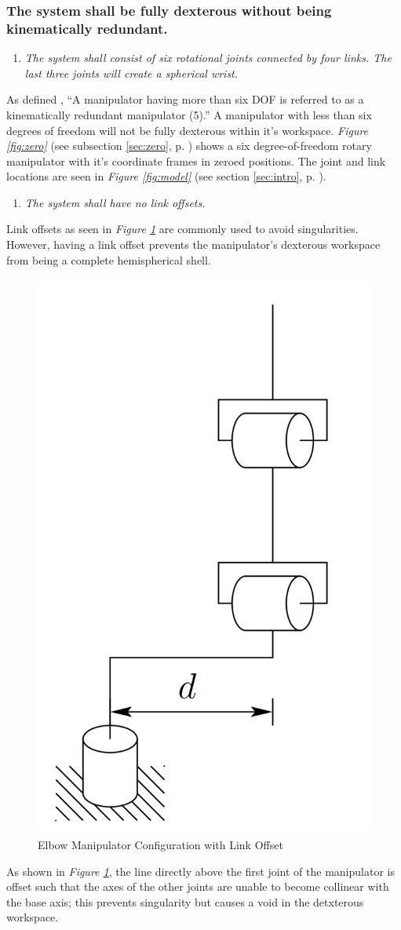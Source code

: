 \documentclass[12pt]{report}
\begin{document}
\subsubsection{The system shall be fully dexterous without being kinematically redundant.}
\begin{enumerate}
\item \textit{The system shall consist of six rotational joints connected by four links. The last three joints will create a spherical wrist.}
\end{enumerate}
As defined \cite{robo}, “A manipulator having more than six DOF is referred to as a kinematically redundant manipulator (5).” A manipulator with less than six degrees of freedom will not be fully dexterous within it's workspace. \emph{Figure \ref{fig:zero}} (see subsection \ref{sec:zero}, p. \pageref{fig:zero}) shows a six degree-of-freedom rotary manipulator with it's coordinate frames in zeroed positions. The joint and link locations are seen in \emph{Figure \ref{fig:model}} (see section \ref{sec:intro}, p. \pageref{sec:intro}).
\begin{enumerate}[resume]
\item \textit{The system shall have no link offsets.}
\end{enumerate}
Link offsets as seen in \emph{Figure \ref{fig:offset}} are commonly used to avoid singularities. However, having a link offset prevents the manipulator's dexterous workspace from being a complete hemispherical shell.

\begin{figure}[htp]
  \centering
  \includegraphics[width=.25\textwidth]{offset}
  \caption[Elbow Manipulator Configuration with Link Offset]{Elbow Manipulator Configuration with Link Offset \cite{robo}}
  \label{fig:offset}
\end{figure}
As shown in \emph{Figure \ref{fig:offset}}, the line directly above the first joint of the manipulator is offset such that the axes of the other joints are unable to become collinear with the base axis; this prevents singularity but causes a void in the detxterous workspace.
\end{document}
